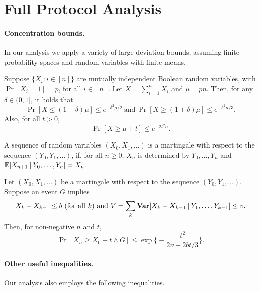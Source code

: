 \section{Full Protocol Analysis}
\label{sec:full-protocol-analysis}

\paragraph{Concentration bounds.}
%
In our analysis we apply a variety of large deviation bounds, assuming finite probability spaces and random variables with finite means.

\begin{theorem} \label{thm:chernoff-bounds}
    Suppose $\{X_i: i \in [n]\}$ are mutually independent Boolean random variables, with $\Pr[X_i = 1] = p$, for all $i \in [n]$. Let $X =\sum^n_{i = 1} X_i$ and $\mu = pn$.
    Then, for any $\delta \in (0, 1]$, it holds that
    \[ \Pr [X \le (1 - \delta) \mu] \le e^{- \delta^2 \mu / 2} ~\text{and}~ \Pr [X \ge (1 + \delta) \mu] \le e^{- \delta^2 \mu / 3}. \]
    Also, for all $t > 0$,
    \[ \Pr[X \ge \mu + t] \le e^{-2 t^2 n}. \]
\end{theorem}

\begin{definition} \label{def:martingale-sequence}
    \emph{\cite[Definition 5.3]{DubPan09}}
    A sequence of random variables $(X_0, X_1, \ldots)$ is a martingale with respect to the sequence $(Y_0, Y_1, \ldots)$, if, for all $n \ge 0$, $X_n$ is determined by $Y_0, \ldots , Y_n$ and $\mathbb{E} [X_{n+1} \mathbin| Y_0, \ldots , Y_n] = X_n$.
\end{definition}

\begin{theorem} \label{thm:martingale-bound}
    \emph{\cite[Theorem 3.15]{McDiarmid98}}
    Let $(X_0, X_1, \ldots)$ be a martingale with respect to the sequence  $(Y_0, Y_1, \ldots)$. Suppose an event $G$ implies
    \[ X_k - X_{k - 1} \le b \text{ (for all $k$) and } V = \sum_k \mathbf{Var} [X_k - X_{k - 1} \mathbin| Y_1, \ldots, Y_{k - 1}] \le v. \]
    Then, for non-negative $n$ and $t$,
    \[ \Pr [X_n \ge X_0 + t \wedge G] \le \exp \Big\{ - \frac{t^2}{2v + 2bt / 3} \Big\}. \]
\end{theorem}

\paragraph{Other useful inequalities.}
%
Our analysis also employs the following inequalities.

